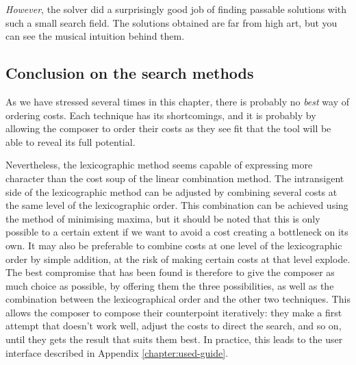 \textit{However}, the solver did a surprisingly good job of finding passable solutions with such a small search field. The solutions obtained are far from high art, but you can see the musical intuition behind them.

\subsection{Conclusion on the search methods}
As we have stressed several times in this chapter, there is probably no \textit{best} way of ordering costs. Each technique has its shortcomings, and it is probably by allowing the composer to order their costs as they see fit that the tool will be able to reveal its full potential. 

Nevertheless, the lexicographic method seems capable of expressing more character than the cost soup of the linear combination method. The intransigent side of the lexicographic method can be adjusted by combining several costs at the same level of the lexicographic order. This combination can be achieved using the method of minimising maxima, but it should be noted that this is only possible to a certain extent if we want to avoid a cost creating a bottleneck on its own.  It may also be preferable to combine costs at one level of the lexicographic order by simple addition, at the risk of making certain costs at that level explode.
The best compromise that has been found is therefore to give the composer as much choice as possible, by offering them the three possibilities, as well as the combination between the lexicographical order and the other two techniques. This allows the composer to compose their counterpoint iteratively: they make a first attempt that doesn't work well, adjust the costs to direct the search, and so on, until they gets the result that suits them best. In practice, this leads to the user interface described in Appendix \ref{chapter:used-guide}.